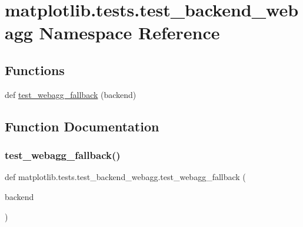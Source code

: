 \hypertarget{namespacematplotlib_1_1tests_1_1test__backend__webagg}{}\section{matplotlib.\+tests.\+test\+\_\+backend\+\_\+webagg Namespace Reference}
\label{namespacematplotlib_1_1tests_1_1test__backend__webagg}
\subsection*{Functions}
\begin{DoxyCompactItemize}
\item 
def \hyperlink{namespacematplotlib_1_1tests_1_1test__backend__webagg_ade03a5edfb25224d93e887c86615b171}{test\+\_\+webagg\+\_\+fallback} (backend)
\end{DoxyCompactItemize}


\subsection{Function Documentation}
\mbox{\label{namespacematplotlib_1_1tests_1_1test__backend__webagg_ade03a5edfb25224d93e887c86615b171}} 
\subsubsection{\texorpdfstring{test\+\_\+webagg\+\_\+fallback()}{test\_webagg\_fallback()}}
{\footnotesize\ttfamily def matplotlib.\+tests.\+test\+\_\+backend\+\_\+webagg.\+test\+\_\+webagg\+\_\+fallback (\begin{DoxyParamCaption}\item[{}]{backend }\end{DoxyParamCaption})}

